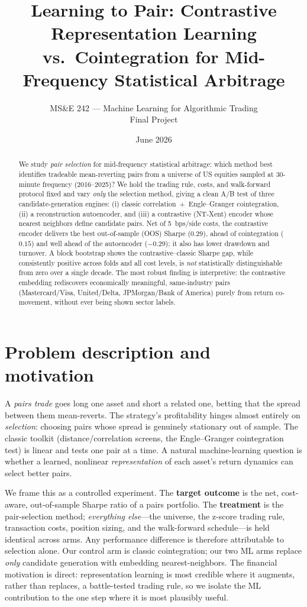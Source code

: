 \documentclass[11pt]{article}
\title{\vspace{-2.5em}Learning to Pair: Contrastive Representation Learning vs.\
Cointegration for Mid-Frequency Statistical Arbitrage}
\author{MS\&E 242 --- Machine Learning for Algorithmic Trading \\ Final Project}
\date{June 2026}
\begin{document}
\maketitle
\vspace{-1.5em}

\begin{abstract}
\noindent We study \emph{pair selection} for mid-frequency statistical arbitrage:
which method best identifies tradeable mean-reverting pairs from a universe of US
equities sampled at 30-minute frequency (2016--2025)? We hold the trading rule,
costs, and walk-forward protocol fixed and vary \emph{only} the selection method,
giving a clean A/B test of three candidate-generation engines: (i) classic
correlation~+~Engle--Granger cointegration, (ii) a reconstruction autoencoder, and
(iii) a contrastive (NT-Xent) encoder whose nearest neighbors define candidate
pairs. Net of 5~bps/side costs, the contrastive encoder delivers the best
out-of-sample (OOS) Sharpe ($0.29$), ahead of cointegration ($0.15$) and well ahead
of the autoencoder ($-0.29$); it also has lower drawdown and turnover. A block
bootstrap shows the contrastive--classic Sharpe gap, while consistently positive
across folds and all cost levels, is \emph{not} statistically distinguishable from
zero over a single decade. The most robust finding is interpretive: the contrastive
embedding rediscovers economically meaningful, same-industry pairs (Mastercard/Visa,
United/Delta, JPMorgan/Bank of America) purely from return co-movement, without ever
being shown sector labels.
\end{abstract}

\section{Problem description and motivation}
A \emph{pairs trade} goes long one asset and short a related one, betting that the
spread between them mean-reverts. The strategy's profitability hinges almost entirely
on \emph{selection}: choosing pairs whose spread is genuinely stationary out of
sample. The classic toolkit (distance/correlation screens, the Engle--Granger
cointegration test) is linear and tests one pair at a time. A natural machine-learning
question is whether a learned, nonlinear \emph{representation} of each asset's return
dynamics can select better pairs.

We frame this as a controlled experiment. The \textbf{target outcome} is the net,
cost-aware, out-of-sample Sharpe ratio of a pairs portfolio. The \textbf{treatment} is
the pair-selection method; \emph{everything else}---the universe, the z-score trading
rule, transaction costs, position sizing, and the walk-forward schedule---is held
identical across arms. Any performance difference is therefore attributable to
selection alone. Our control arm is classic cointegration; our two ML arms replace
\emph{only} candidate generation with embedding nearest-neighbors. The financial
motivation is direct: representation learning is most credible where it augments,
rather than replaces, a battle-tested trading rule, so we isolate the ML contribution
to the one step where it is most plausibly useful.
\end{document}
